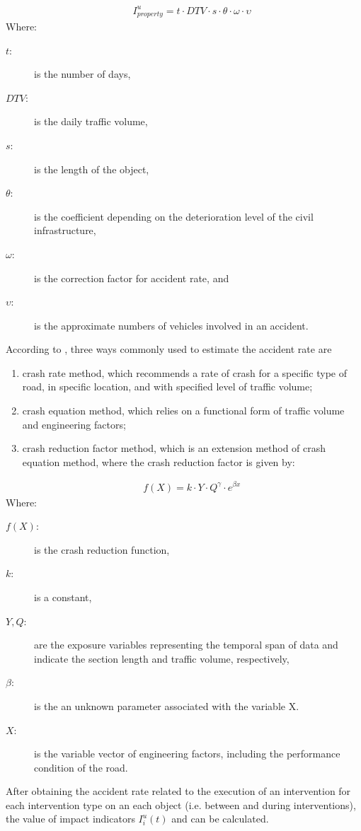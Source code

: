 \begin{eqnarray}
      && I_{property}^u = t \cdot DTV \cdot s \cdot \theta  \cdot \omega  \cdot \upsilon \label{safety1}
\end{eqnarray}
Where:
\begin{adjustwidth}{1cm}{}
\begin{description}
\item[$t$:] is the number of days,
\item[$DTV$:] is the daily traffic volume,
\item[$s$:] is the length of the object,
\item[$\theta$:] is the coefficient depending on the deterioration level of the civil infrastructure,
\item[$\omega$:] is the correction factor for accident rate, and
\item[$\upsilon$:] is the approximate numbers of vehicles involved in an accident.
\end{description}
\end{adjustwidth}
According to \cite{tarko2000}, three ways commonly used to estimate the accident rate are 
\begin{enumerate}
	\item crash rate method, which recommends a rate of crash for a specific type of road, in specific location, and with specified level of traffic volume; 
	\item crash equation method, which relies on a functional form of traffic volume and engineering factors; 
	\item crash reduction factor method, which is an extension method of crash equation method, where the crash reduction factor is given by: 
\end{enumerate}

\begin{eqnarray}
      && f(X) = k \cdot Y \cdot {Q^\gamma } \cdot {e^{\beta x}} \label{safety2}
\end{eqnarray}
Where:
\begin{adjustwidth}{1cm}{}
\begin{description}
\item[$f(X)$:] is the crash reduction function,
\item[$k$:] is a constant,
\item[$Y, Q$:] are the exposure variables representing the temporal span of data and indicate the section length and traffic volume, respectively, 
\item[$\beta$:] is the an unknown parameter associated with the variable X.
\item[$X$:] is the variable vector of engineering factors, including the performance condition of the road.
\end{description}
\end{adjustwidth}
After obtaining the accident rate related to the execution of an intervention for each intervention type on an each object (i.e. between and during interventions), the value of impact indicators $I_i^u(t)$ and can be calculated. 

